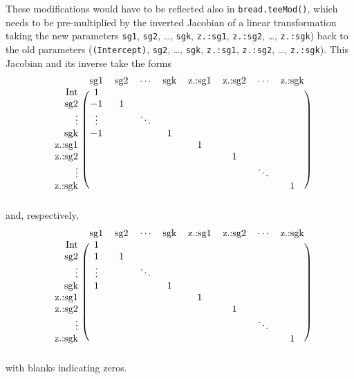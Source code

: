 \documentclass{article}
\begin{document}
These modifications would have to be reflected also in
\texttt{bread.teeMod()}, which needs to be pre-multiplied by the inverted
Jacobian of a linear transformation
taking the new parameters \texttt{sg1}, \texttt{sg2}, \ldots,
\texttt{sgk}, \texttt{z.:sg1}, \texttt{z.:sg2}, \ldots,
\texttt{z.:sgk}) back to the old parameters (\texttt{(Intercept)}, \texttt{sg2}, \ldots,
\texttt{sgk}, \texttt{z.:sg1}, \texttt{z.:sg2}, \ldots,
\texttt{z.:sgk}).  This Jacobian and its inverse take the forms
\begin{equation*}
  \begin{blockarray}{rcccccccc}
& \text{sg1}& \text{sg2} & \cdots & \text{sgk} & \text{z.:sg1} & \text{z.:sg2}& \cdots & \text{z.:sgk} \\ 
    \begin{block}{r(cccccccc)}
         \text{Int} &1  &&&&&&&\\
    \text{sg2}&-1  &1&&&&&&\\
    \vdots& \vdots &&\ddots&&&&&\\
    \text{sgk}&-1 &&&1&&&&\\
    \text{z.:sg1}&  &&&&1&&&\\
    \text{z.:sg2}&  &&&&&1&&\\
    \vdots&  &&&&&&\ddots&\\
    \text{z.:sgk}& &&&&&&&1\\
    \end{block}
  \end{blockarray}
\end{equation*}
and, respectively, 
\begin{equation*}
  \begin{blockarray}{rcccccccc}
& \text{sg1}& \text{sg2} & \cdots & \text{sgk} & \text{z.:sg1} & \text{z.:sg2}& \cdots & \text{z.:sgk} \\ 
    \begin{block}{r(cccccccc)}
         \text{Int} &1  &&&&&&&\\
    \text{sg2}&1  &1&&&&&&\\
    \vdots&\vdots  &&\ddots&&&&&\\
    \text{sgk}&1 &&&1&&&&\\
    \text{z.:sg1}&  &&&&1&&&\\
    \text{z.:sg2}&  &&&&&1&&\\
    \vdots&  &&&&&&\ddots &\\
    \text{z.:sgk}& &&&&&&&1\\
    \end{block}
  \end{blockarray}
\end{equation*}
with blanks indicating zeros.
\end{document}
